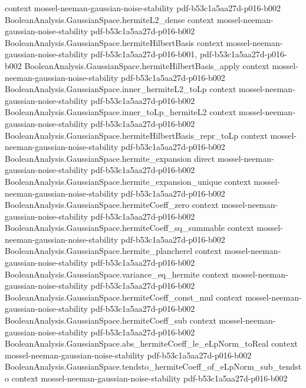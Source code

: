 \begin{theorem}
  {context}
  {mossel-neeman-gaussian-noise-stability}
  {pdf-b53c1a5aa27d-p016-b002}
\proofstep
  {BooleanAnalysis.GaussianSpace.hermiteL2_dense}
  {context}
  {mossel-neeman-gaussian-noise-stability}
  {pdf-b53c1a5aa27d-p016-b002}
\proofstep
  {BooleanAnalysis.GaussianSpace.hermiteHilbertBasis}
  {context}
  {mossel-neeman-gaussian-noise-stability}
  {pdf-b53c1a5aa27d-p016-b001,
    pdf-b53c1a5aa27d-p016-b002}
\proofstep
  {BooleanAnalysis.GaussianSpace.hermiteHilbertBasis_apply}
  {context}
  {mossel-neeman-gaussian-noise-stability}
  {pdf-b53c1a5aa27d-p016-b002}
\proofstep
  {BooleanAnalysis.GaussianSpace.inner_hermiteL2_toLp}
  {context}
  {mossel-neeman-gaussian-noise-stability}
  {pdf-b53c1a5aa27d-p016-b002}
\proofstep
  {BooleanAnalysis.GaussianSpace.inner_toLp_hermiteL2}
  {context}
  {mossel-neeman-gaussian-noise-stability}
  {pdf-b53c1a5aa27d-p016-b002}
\proofstep
  {BooleanAnalysis.GaussianSpace.hermiteHilbertBasis_repr_toLp}
  {context}
  {mossel-neeman-gaussian-noise-stability}
  {pdf-b53c1a5aa27d-p016-b002}
\proofstep
  {BooleanAnalysis.GaussianSpace.hermite_expansion}
  {direct}
  {mossel-neeman-gaussian-noise-stability}
  {pdf-b53c1a5aa27d-p016-b002}
\proofstep
  {BooleanAnalysis.GaussianSpace.hermite_expansion_unique}
  {context}
  {mossel-neeman-gaussian-noise-stability}
  {pdf-b53c1a5aa27d-p016-b002}
\proofstep
  {BooleanAnalysis.GaussianSpace.hermiteCoeff_zero}
  {context}
  {mossel-neeman-gaussian-noise-stability}
  {pdf-b53c1a5aa27d-p016-b002}
\proofstep
  {BooleanAnalysis.GaussianSpace.hermiteCoeff_sq_summable}
  {context}
  {mossel-neeman-gaussian-noise-stability}
  {pdf-b53c1a5aa27d-p016-b002}
\proofstep
  {BooleanAnalysis.GaussianSpace.hermite_plancherel}
  {context}
  {mossel-neeman-gaussian-noise-stability}
  {pdf-b53c1a5aa27d-p016-b002}
\proofstep
  {BooleanAnalysis.GaussianSpace.variance_eq_hermite}
  {context}
  {mossel-neeman-gaussian-noise-stability}
  {pdf-b53c1a5aa27d-p016-b002}
\proofstep
  {BooleanAnalysis.GaussianSpace.hermiteCoeff_const_mul}
  {context}
  {mossel-neeman-gaussian-noise-stability}
  {pdf-b53c1a5aa27d-p016-b002}
\proofstep
  {BooleanAnalysis.GaussianSpace.hermiteCoeff_sub}
  {context}
  {mossel-neeman-gaussian-noise-stability}
  {pdf-b53c1a5aa27d-p016-b002}
\proofstep
  {BooleanAnalysis.GaussianSpace.abs_hermiteCoeff_le_eLpNorm_toReal}
  {context}
  {mossel-neeman-gaussian-noise-stability}
  {pdf-b53c1a5aa27d-p016-b002}
\proofstep
  {BooleanAnalysis.GaussianSpace.tendsto_hermiteCoeff_of_eLpNorm_sub_tendsto}
  {context}
  {mossel-neeman-gaussian-noise-stability}
  {pdf-b53c1a5aa27d-p016-b002}
\proofstep

\end{theorem}
